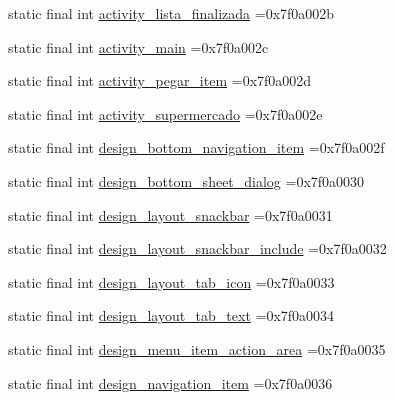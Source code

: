 \begin{DoxyCompactItemize}
\item 
static final int \mbox{\hyperlink{classbr_1_1unb_1_1cic_1_1mp_1_1marketmaster_1_1R_1_1layout_a8d6e86ebe72e1e7afb68a92d4edd245a}{activity\+\_\+lista\+\_\+finalizada}} =0x7f0a002b
\item 
static final int \mbox{\hyperlink{classbr_1_1unb_1_1cic_1_1mp_1_1marketmaster_1_1R_1_1layout_afe71625adc2224b3ff5bcb3e6eaada48}{activity\+\_\+main}} =0x7f0a002c
\item 
static final int \mbox{\hyperlink{classbr_1_1unb_1_1cic_1_1mp_1_1marketmaster_1_1R_1_1layout_ab4cd45cdc70b57e067f436da534c9933}{activity\+\_\+pegar\+\_\+item}} =0x7f0a002d
\item 
static final int \mbox{\hyperlink{classbr_1_1unb_1_1cic_1_1mp_1_1marketmaster_1_1R_1_1layout_ad8e45449f3bd6cc6d9b21efbac42f29d}{activity\+\_\+supermercado}} =0x7f0a002e
\item 
static final int \mbox{\hyperlink{classbr_1_1unb_1_1cic_1_1mp_1_1marketmaster_1_1R_1_1layout_aa9890bb8154f9e910945e4784532c482}{design\+\_\+bottom\+\_\+navigation\+\_\+item}} =0x7f0a002f
\item 
static final int \mbox{\hyperlink{classbr_1_1unb_1_1cic_1_1mp_1_1marketmaster_1_1R_1_1layout_a632c34abb74923056812540139c9c446}{design\+\_\+bottom\+\_\+sheet\+\_\+dialog}} =0x7f0a0030
\item 
static final int \mbox{\hyperlink{classbr_1_1unb_1_1cic_1_1mp_1_1marketmaster_1_1R_1_1layout_ab231b1342f3b1b5e64ad348d00c9733e}{design\+\_\+layout\+\_\+snackbar}} =0x7f0a0031
\item 
static final int \mbox{\hyperlink{classbr_1_1unb_1_1cic_1_1mp_1_1marketmaster_1_1R_1_1layout_a2dd5db102b2344067c0221823a27afcc}{design\+\_\+layout\+\_\+snackbar\+\_\+include}} =0x7f0a0032
\item 
static final int \mbox{\hyperlink{classbr_1_1unb_1_1cic_1_1mp_1_1marketmaster_1_1R_1_1layout_abf21e067caca147cc8c6058e4ea0d9b3}{design\+\_\+layout\+\_\+tab\+\_\+icon}} =0x7f0a0033
\item 
static final int \mbox{\hyperlink{classbr_1_1unb_1_1cic_1_1mp_1_1marketmaster_1_1R_1_1layout_a6e01e870c8e3775d24d8b5ceabe37d9b}{design\+\_\+layout\+\_\+tab\+\_\+text}} =0x7f0a0034
\item 
static final int \mbox{\hyperlink{classbr_1_1unb_1_1cic_1_1mp_1_1marketmaster_1_1R_1_1layout_a714192d0318d29e53cebc550f0237c30}{design\+\_\+menu\+\_\+item\+\_\+action\+\_\+area}} =0x7f0a0035
\item 
static final int \mbox{\hyperlink{classbr_1_1unb_1_1cic_1_1mp_1_1marketmaster_1_1R_1_1layout_a61652c30ff968b3c87faa66f2f5a42df}{design\+\_\+navigation\+\_\+item}} =0x7f0a0036

\end{DoxyCompactItemize}
